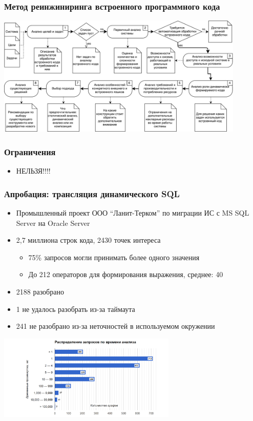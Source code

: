 \documentclass{beamer}
\begin{document}
\begin{frame}[t]
    \transwipe[direction=90]
    \frametitle{Метод реинжиниринга встроенного программного кода}
    \begin{center}
        \includegraphics[width=335pt]{pictures/ActivMethodology.pdf}
    \end{center}
\end{frame}

\begin{frame}[t]
    \transwipe[direction=90]
    \frametitle{Ограничения}
    \begin{itemize}
        \item НЕЛЬЗЯ!!!!
    \end{itemize}
\end{frame}

\begin{frame}[t]
    \transwipe[direction=90]
    \frametitle{Апробация: трансляция динамического SQL}
    \begin{itemize}
    \item Промышленный проект ООО ``Ланит-Терком'' по миграции ИС с MS SQL Server на Oracle Server
    \item 2,7 миллиона строк кода, 2430 точек интереса
        \begin{itemize}
            \item 75\% запросов могли принимать более одного значения
            \item До 212 операторов для формирования выражения, среднее: 40  
        \end{itemize}
    \item 2188 разобрано
    \item 1 не удалось разобрать из-за таймаута
    \item 241 не разобрано из-за неточностей в используемом окружении
  \end{itemize}
  \includegraphics[width=8.5cm]{pictures/dist.png}
\end{frame}
\end{document}
